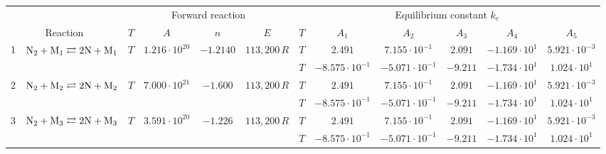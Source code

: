 \documentclass{warpdoc}
\renewcommand{\fontsizetable}{\footnotesize\scalefont{0.9}}
\begin{document}
%




%
\begin{table}[!ht]
\fontsizetable
\begin{center}
\begin{threeparttable}
\setlength\tabcolsep{1.5pt}
\begin{tabular}{cccccccccccc} 
\toprule
~&~&\multicolumn{4}{c}{Forward reaction} & \multicolumn{6}{c}{Equilibrium constant $k_e$} \\
 \cmidrule(lr){3-6}\cmidrule(lr){7-12}
\multicolumn{2}{c}{Reaction} & $T$ & $A$ & $n$ & $E$ & $T$  & $A_1$ & $A_2$ & $A_3$ &$A_4$& $A_5$\\ 
\midrule
1 & $\rm N_2 + M_1 \rightleftarrows 2N+M_1$ &$T$ & $1.216 \cdot 10^{20}$  & $-1.2140$    & $113,200\, R$  
                                          &$T$  & $2.491$  & $7.155 \cdot 10^{-1}$  & $2.091$ & $-1.169 \cdot 10^{1}$ & $5.921 \cdot 10^{-3}$\\
 & & & & &                                &$T$  & $-8.575 \cdot 10^{-1}$  & $-5.071 \cdot 10^{-1}$  & $-9.211$ & $-1.734 \cdot 10^{1}$ & $1.024 \cdot 10^{1}$\\                                          
                                          
2 & $\rm N_2 + M_2 \rightleftarrows 2N+M_2$ &$T$  & $7.000 \cdot 10^{21}$ & $-1.600$ & $113,200\, R$ 
                                          &$T$  & $2.491$  & $7.155 \cdot 10^{-1}$  & $2.091$ & $-1.169 \cdot 10^{1}$ & $5.921 \cdot 10^{-3}$\\
 & & & & &                                &$T$  & $-8.575 \cdot 10^{-1}$  & $-5.071 \cdot 10^{-1}$  & $-9.211$ & $-1.734 \cdot 10^{1}$ & $1.024 \cdot 10^{1}$\\                                          
                                          
3 & $\rm N_2 + M_3 \rightleftarrows 2N+M_3$ &$T$  & $3.591 \cdot 10^{20}$ & $-1.226$ & $113,200\, R$ 
                                          &$T$  & $2.491$  & $7.155 \cdot 10^{-1}$  & $2.091$ & $-1.169 \cdot 10^{1}$ & $5.921 \cdot 10^{-3}$\\
 & & & & &                                &$T$  & $-8.575 \cdot 10^{-1}$  & $-5.071 \cdot 10^{-1}$  & $-9.211$ & $-1.734 \cdot 10^{1}$ & $1.024 \cdot 10^{1}$\\                                          
                                          

\end{tabular}
\end{threeparttable}
\end{center}
\end{table}
\end{document}
